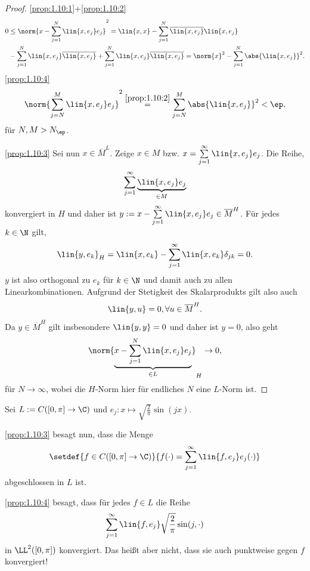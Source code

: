 \begin{proof}
\ref{prop:1.10:1}+\ref{prop:1.10:2}
\begin{align*}
0 &\le \norm{x-\sum\limits_{j=1}^N\lin{x,e_j}e_j}^2 = \lin{x,x} -
\sum\limits_{j=1}^N \overline{\lin{x,e_j}}\lin{x,e_j} \\
&- \sum\limits_{j=1}^N
\lin{x,e_j}\overline{\lin{x,e_j}} + \sum\limits_{j=1}^N
\lin{x,e_j}\overline{\lin{x,e_j}}
 =\norm{x}^2 - \sum\limits_{j=1}^N \abs{\lin{x,e_j}}^2.
\end{align*}
\ref{prop:1.10:4}
\begin{align*}
\norm{\sum\limits_{j=N}^M \lin{x,e_j}e_j}^2 \overset{\ref{prop:1.10:2}}{=}
\sum\limits_{j=N}^M \abs{\lin{x,e_j}}^2 < \ep, 
\end{align*}
für $N,M > N_\ep$.

\ref{prop:1.10:3}
Sei nun $x\in\overline{M}^L$. Zeige $x\in M$ bzw. $x=\sum\limits_{j=1}^\infty
\lin{x,e_j}e_j$. Die Reihe,
\begin{align*}
\sum\limits_{j=1}^\infty
\underbrace{\lin{x,e_j}e_j}_{\in M}
\end{align*}
konvergiert in $H$ und daher ist $y:=x-\sum\limits_{j=1}^\infty
\lin{x,e_j}e_j\in\overline{M}^H$. Für jedes $k\in\N$ gilt,
\begin{align*}
\lin{y,e_k}_H = \lin{x,e_k} - \sum\limits_{j=1}^{\infty}\lin{x,e_k}\delta_{jk}
= 0.
\end{align*}
$y$ ist also orthogonal zu $e_k$ für $k\in\N$ und damit auch zu allen
Linearkombinationen. Aufgrund der Stetigkeit des Skalarprodukts gilt also auch
\begin{align*}
\lin{y,u} = 0,\forall u\in\overline{M}^H.
\end{align*}
Da $y\in\overline{M}^H$ gilt insbesondere $\lin{y,y} = 0$ und daher ist $y =
0$, also geht
\begin{align*}
\norm{\underbrace{x-\sum\limits_{j=1}^N
\lin{x,e_j}e_j}_{\in L}}_H \to 0,
\end{align*}
für $N\to\infty$, wobei die $H$-Norm hier für endliches $N$ eine $L$-Norm
ist.\qedhere
\end{proof}

\begin{bsp}
\label{bsp:1.11}
Sei $L:=C([0,\pi]\to\C)$ und $e_j: x\mapsto \sqrt{\frac{2}{\pi}}\sin(jx)$.

\ref{prop:1.10:3} besagt nun, dass die Menge
\begin{align*}
\setdef{f\in C([0,\pi]\to\C)}{f(\cdot) = \sum\limits_{j=1}^\infty
\lin{f,e_j}e_j(\cdot)}
\end{align*}
abgeschlossen in $L$ ist.

\ref{prop:1.10:4} besagt, dass für jedes $f\in L$ die Reihe
\begin{align*}
\sum\limits_{j=1}^\infty \lin{f,e_j}\sqrt{\frac{2}{\pi}} \sin(j,\cdot)
\end{align*}
in $\LL^2([0,\pi])$ konvergiert. Das heißt aber nicht, dass sie auch punktweise
gegen $f$ konvergiert!\bsphere
\end{bsp}

